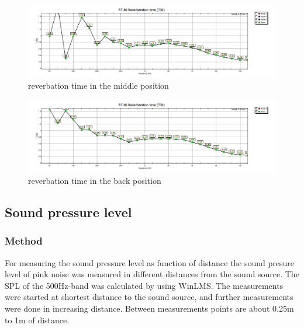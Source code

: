 \documentclass{article}
\begin{document}
\begin{figure}[htbp]
\begin{center}
\includegraphics[width=15cm,keepaspectratio=true]{reverbationmiddle}
\caption{reverbation time in the middle position}
\label{fig:reverbationmiddle}
\end{center}
\end{figure}
\begin{figure}[htbp]
\begin{center}
\includegraphics[width=15cm,keepaspectratio=true]{reverbationback}
\caption{reverbation time in the back position}
\label{fig:reverbationback}
\end{center}
\end{figure}
\subsection{Sound pressure level}
\subsubsection{Method}
For measuring the sound pressure level as function of distance the sound presure level of pink noise was measured in different distances from the sound source. The SPL of the 500Hz-band was calculated by using WinLMS. The measurements were started at shortest distance to the sound source, and further measurements were done in increasing distance. Between measurements points are about 0.25m to 1m of distance. 
\end{document}
